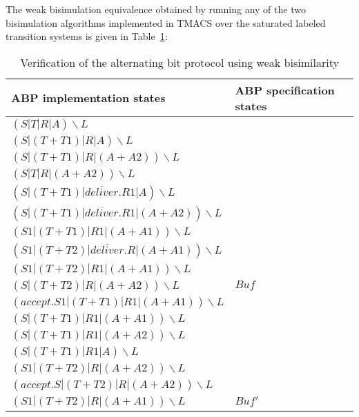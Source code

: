 The weak bisimulation equivalence obtained by running any of the two bisimulation algorithms implemented in TMACS over the saturated labeled transition systems is given in Table~\ref{table3}:

\begin{table}
\begin{tabular}{| p{6.5cm} | p{3.5cm} | }
	
  \hline                       
	ABP implementation states &
	ABP specification states
	\\ \hline
	
$\left(S|T|R|A\right)\backslash L$ & \\
$\left(S|\left(T+T1\right)|R|A\right)\backslash L$ & \\
$\left(S|\left(T+T1\right)|R|\left(A+A2\right)\right)\backslash L$ & \\
$\left(S|T|R|\left(A+A2\right)\right)\backslash L$ & \\
$\left(S|\left(T+T1\right)|\overline{deliver}.R1|A\right)\backslash L$ & \\
$\left(S|\left(T+T1\right)|\overline{deliver}.R1|\left(A+A2\right)\right)\backslash L$ & \\
$\left(S1|\left(T+T1\right)|R1|\left(A+A1\right)\right)\backslash L$ & \\
$\left(S1|\left(T+T2\right)|\overline{deliver}.R|\left(A+A1\right)\right)\backslash L$ & \\
$\left(S1|\left(T+T2\right)|R1|\left(A+A1\right)\right)\backslash L$ & \\
$\left(S|\left(T+T2\right)|R|\left(A+A2\right)\right)\backslash L$ &
  $\mathit{Buf}$   
  \\ \hline
   
$\left(accept.S1|\left(T+T1\right)|R1|\left(A+A1\right)\right)\backslash L$ & \\ 
$\left(S|\left(T+T1\right)|R1|\left(A+A1\right)\right)\backslash L$ & \\
$\left(S|\left(T+T1\right)|R1|\left(A+A2\right)\right)\backslash L$ & \\
$\left(S|\left(T+T1\right)|R1|A\right)\backslash L$ & \\
$\left(S1|\left(T+T2\right)|R|\left(A+A2\right)\right)\backslash L$ & \\
$\left(accept.S|\left(T+T2\right)|R|\left(A+A2\right)\right)\backslash L$ & \\
$\left(S1|\left(T+T2\right)|R|\left(A+A1\right)\right)\backslash L$ &
  $\mathit{Buf'}$
  \\ \hline  
\end{tabular}
\\
\caption{Verification of the alternating bit protocol using weak bisimilarity}
\label{table3}
\end{table}
